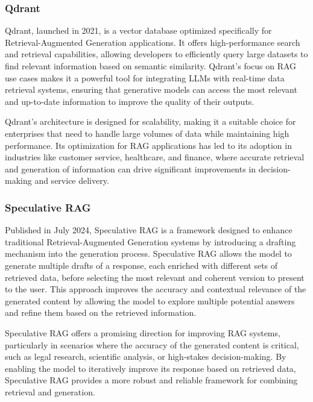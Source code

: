 \subsubsection{Qdrant}

Qdrant, launched in 2021, is a vector database optimized specifically for Retrieval-Augmented Generation applications. 
It offers high-performance search and retrieval capabilities, allowing developers to efficiently query large datasets to find relevant information based on semantic similarity. 
Qdrant’s focus on RAG use cases makes it a powerful tool for integrating LLMs with real-time data retrieval systems, ensuring that generative models can access the most relevant and up-to-date information to improve the quality of their outputs.

Qdrant’s architecture is designed for scalability, making it a suitable choice for enterprises that need to handle large volumes of data while maintaining high performance. 
Its optimization for RAG applications has led to its adoption in industries like customer service, healthcare, and finance, where accurate retrieval and generation of information can drive significant improvements in decision-making and service delivery.

\subsubsection{Speculative RAG}

Published in July 2024, Speculative RAG is a framework designed to enhance traditional Retrieval-Augmented Generation systems by introducing a drafting mechanism into the generation process. 
Speculative RAG allows the model to generate multiple drafts of a response, each enriched with different sets of retrieved data, before selecting the most relevant and coherent version to present to the user. 
This approach improves the accuracy and contextual relevance of the generated content by allowing the model to explore multiple potential answers and refine them based on the retrieved information.

Speculative RAG offers a promising direction for improving RAG systems, particularly in scenarios where the accuracy of the generated content is critical, such as legal research, scientific analysis, or high-stakes decision-making. 
By enabling the model to iteratively improve its response based on retrieved data, Speculative RAG provides a more robust and reliable framework for combining retrieval and generation.

